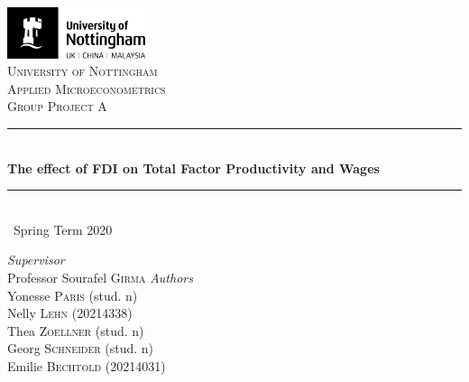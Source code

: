 \documentclass[a4paper,12pt]{scrartcl}
\newcommand{\sectionnumbering}[1]{%
  \setcounter{section}{0}%
   \renewcommand{\thesection}{\csname #1\endcsname{section}}}
\begin{document}
	\begin{titlepage}
		\newcommand{\HRule}{\rule{\linewidth}{0.5mm}}
		
	\vfill\vfill
	\includegraphics[height=1.5cm]{UoN_Logo}\\[1cm] 


	\center			
	\textsc{\LARGE University of Nottingham}\\[1.5cm] 
	\textsc{\Large Applied Microeconometrics}\\[0.5cm] 	
	\textsc{\large Group Project A}\\[0.5cm] 
	
	\HRule\\[0.4cm]
	{\huge\bfseries The effect of FDI on Total Factor Productivity and Wages}\\[0.4cm] 
	\HRule\\[0.4cm]
	
	{\large\ Spring Term 2020} 	
	\vfill\vfill\vfill 		
	
\begin{flushleft}
			\large
			\textit{Supervisor}\\
			Professor Sourafel \textsc{Girma} 
			\vfill\vfill 
			\textit{Authors}\\
			Yonesse \textsc{Paris} (stud. n)\\
			Nelly  \textsc{Lehn} (20214338)\\
			Thea  \textsc{Zoellner} (stud. n)\\
			Georg  \textsc{Schneider} (stud. n)\\
			Emilie \textsc{Bechtold} (20214031)
		\end{flushleft}
	\vfill 
	
\end{titlepage}


\sectionnumbering{Roman}
\tableofcontents

\newpage

\listoftables
\newpage

\sectionnumbering{arabic}
\end{document}
